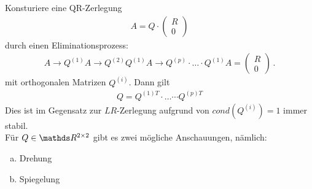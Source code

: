 
Konsturiere eine QR-Zerlegung
\begin{gather}
  A= Q\cdot \begin{pmatrix} R\\0 \end{pmatrix}
  \label{IV.4.1}
\end{gather}
durch einen Eliminationsprozess:
\begin{gather}
  A \rightarrow Q^{(1)}A \rightarrow Q^{(2)} Q^{(1)}A \rightarrow Q^{(p)}\cdot \dotsc \cdot Q^{(1)}A
  = \begin{pmatrix} R\\0 \end{pmatrix}\, .
  \label{IV.4.2}
\end{gather}
mit orthogonalen Matrizen $Q^{(i)}$.
Dann gilt
\begin{gather}
  Q= Q^{(1)T}\cdot \dotsc \cdots {Q^{(p)T}}
  \label{IV.4.3}
\end{gather}
Dies ist im Gegensatz zur $LR$-Zerlegung aufgrund von $cond(Q^{(i)})= 1$ immer stabil.\\

Für $Q\in\R^{2\times 2}$ gibt es zwei mögliche Anschauungen, nämlich:
\begin{enumerate}[a)]
\item Drehung ~~~
  \label{im4.4(1)}
\item Spiegelung ~~~
  \label{im4.4(2)}
\end{enumerate}

